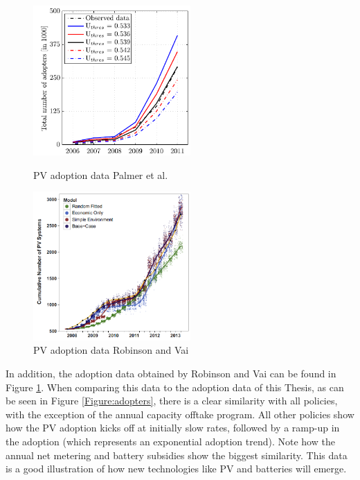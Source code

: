 \begin{figure}[!tbp]
  \centering
  \begin{minipage}[b]{0.4\textwidth}
    \includegraphics[width=6cm]{Policies/Italyadoption.PNG}
    \caption[PV adoption data Palmer et al.]{PV adoption data Palmer et al. \cite{ItalyAdoption}}
    \label{Figure:italyadoption}
  \end{minipage}
  \hfill
  \begin{minipage}[b]{0.4\textwidth}
    \includegraphics[width=6cm]{Policies/robinsonadoption.PNG}
    \caption[PV adoption data Robinson and Vai]{PV adoption data Robinson and Vai \cite{spatiotemp}}
    \label{Figure:spatiotemp}
  \end{minipage}
\end{figure}
\noindent
In addition, the adoption data obtained by Robinson and Vai can be found in Figure \ref{Figure:spatiotemp}. When comparing this data to the adoption data of this Thesis, as can be seen in Figure \ref{Figure:adopters}, there is a clear similarity with all policies, with the exception of the annual capacity offtake program. All other policies show how the PV adoption kicks off at initially slow rates, followed by a ramp-up in the adoption (which represents an exponential adoption trend). Note how the annual net metering and battery subsidies show the biggest similarity. This data is a good illustration of how new technologies like PV and batteries will emerge. 
\noindent
